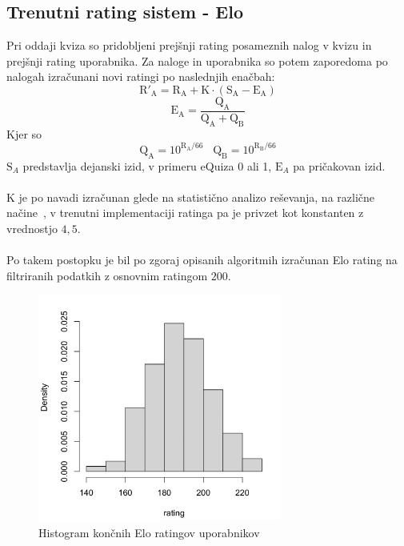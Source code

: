 \documentclass{IEEEtran}
\makeatletter
\let\old@subsection\subsection
\renewcommand{\subsection}[1]{\bigskip\old@subsection{#1}\@afterindentfalse\@afterheading}
\makeatother
\begin{document}
\subsection{Trenutni rating sistem - Elo}
\label{sec:elo}
Pri oddaji kviza so pridobljeni prejšnji rating posameznih nalog v kvizu in prejšnji rating uporabnika. Za naloge in uporabnika so potem zaporedoma po nalogah izračunani novi ratingi po naslednjih enačbah:
\begin{equation}
    \mathrm{R'}_\mathrm{A}=\mathrm{R}_\mathrm{A}+\mathrm{K}\cdot \left ( \mathrm{S}_\mathrm{A}-\mathrm{E}_\mathrm{A} \right )
\end{equation}
\begin{equation}
    \mathrm{E}_\mathrm{A}=\frac{\mathrm{Q}_\mathrm{A}}{\mathrm{Q}_\mathrm{A}+\mathrm{Q}_\mathrm{B}}
\end{equation}
Kjer so
\begin{equation}
    \mathrm{Q}_\mathrm{A}=10^{\mathrm{R}_\mathrm{A}/66}\;\;\;\mathrm{Q}_\mathrm{B}=10^{\mathrm{R}_\mathrm{B}/66}
\end{equation}
$\mathrm{S}_{A}$ predstavlja dejanski izid, v primeru eQuiza 0 ali 1, $\mathrm{E}_{A}$ pa pričakovan izid.
\hfill
\\
\\
$\mathrm{K}$ je po navadi izračunan glede na statistično analizo reševanja, na različne načine~\cite{wiki},
v trenutni implementaciji ratinga pa je privzet kot konstanten z vrednostjo $4,5$.
\hfill
\\
\\
Po takem postopku je bil po zgoraj opisanih algoritmih izračunan Elo rating na filtriranih podatkih z osnovnim ratingom $200$. %
\begin{figure}[h!]
    \includegraphics[width=8cm]{EloUserPrev}
    \caption{Histogram končnih Elo ratingov uporabnikov}%
    \label{fig:eloPrevU}%
\end{figure}
\end{document}
